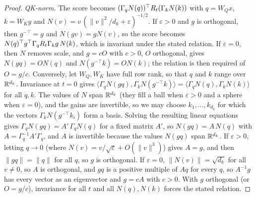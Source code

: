 \begin{proof}
\emph{QK-norm.} The score becomes $(\Gamma_qN(q))^{\top} R_t(\Gamma_kN(k))$ with $q=W_Qx$, $k=W_Ky$ and
$N(v)=v\,(\lVert v\rVert^2/d_k+\varepsilon)^{-1/2}$. If $\varepsilon>0$ and $g$ is orthogonal, then $g^{-\top}=g$ and $N(gv)=gN(v)$,
so the score becomes $N(q)^{\top} g^{\top}\Gamma_qR_t\Gamma_kg\,N(k)$, which is invariant under the stated relation. If $\varepsilon=0$, then
$N$ removes scale, and $g=cO$ with $c>0$, $O$ orthogonal, gives $N(gq)=ON(q)$ and $N(g^{-\top}k)=ON(k)$; the relation is then
required of $O=g/c$. Conversely, let $W_Q,W_K$ have full row rank, so that $q$ and $k$ range over $\mathbb{R}^{d_k}$. Invariance at $t=0$
gives $\langle\Gamma_qN(gq),\Gamma_kN(g^{-\top}k)\rangle=\langle\Gamma_qN(q),\Gamma_kN(k)\rangle$ for all $q,k$. The values of $N$ span
$\mathbb{R}^{d_k}$ (they fill a ball when $\varepsilon>0$ and a sphere when $\varepsilon=0$), and the gains are invertible, so we may
choose $k_1,\dots,k_{d_k}$ for which the vectors $\Gamma_kN(g^{-\top}k_i)$ form a basis. Solving the resulting linear
equations gives $\Gamma_qN(gq)=A'\,\Gamma_qN(q)$ for a fixed matrix $A'$, so $N(gq)=A\,N(q)$ with $A=\Gamma_q^{-1}A'\Gamma_q$, and
$A$ is invertible because the values $N(gq)$ span $\mathbb{R}^{d_k}$. If $\varepsilon>0$, letting $q\to0$ (where $N(v)=v/\sqrt\varepsilon+O(\lVert v\rVert^3)$) gives $A=g$, and
then $\lVert gq\rVert=\lVert q\rVert$ for all $q$, so $g$ is orthogonal. If $\varepsilon=0$, $\lVert N(v)\rVert=\sqrt{d_k}$ for all
$v\ne0$, so $A$ is orthogonal, and $gq$ is a positive multiple of $Aq$ for every $q$, so $A^{-1}g$ has every vector as an
eigenvector and $g=cA$ with $c>0$. With $g$ orthogonal (or $O=g/c$), invariance for all $t$ and all $N(q),N(k)$ forces the
stated relation.


\end{proof}
